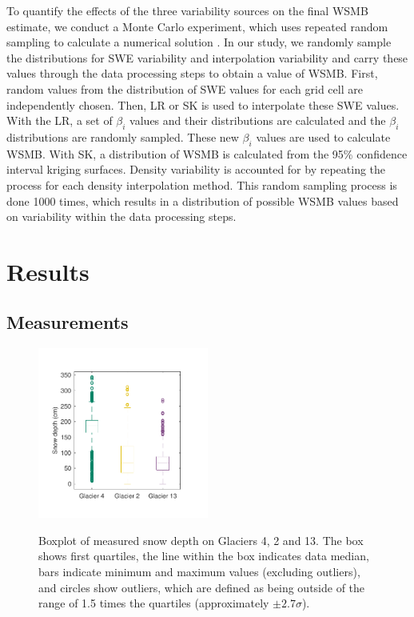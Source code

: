 \documentclass[review,oneside, letterpaper]{igs}
\begin{document}
To quantify the effects of the three variability sources on the final WSMB estimate, we conduct a Monte Carlo experiment, which uses repeated random sampling to calculate a numerical solution \citep{Metropolis1949}. In our study, we randomly sample the distributions for SWE variability and interpolation variability and carry these values through the data processing steps to obtain a value of WSMB. First, random values from the distribution of SWE values for each grid cell are independently chosen. Then, LR or SK is used to interpolate these SWE values. With the LR, a set of $\beta_i$ values and their distributions are calculated and the $\beta_i$ distributions are randomly sampled. These new $\beta_i$ values are used to calculate WSMB. With SK, a distribution of WSMB is calculated from the 95\% confidence interval kriging surfaces. Density variability is accounted for by repeating the process for each density interpolation method. This random sampling process is done 1000 times, which results in a distribution of possible WSMB values based on variability within the data processing steps.

\section{Results}

\subsection{Measurements}

\begin{figure}
	\centering
	\includegraphics[width =0.5\textwidth]{DepthBoxplot.pdf}\\
	\caption{Boxplot of measured snow depth on Glaciers 4, 2 and 13. The box shows first quartiles, the line within the box indicates data median, bars indicate minimum and maximum values (excluding outliers), and circles show outliers, which are defined as being outside of the range of 1.5 times the quartiles (approximately $\pm2.7\sigma$). }
	\label{fig:DepthBoxplot}
\end{figure}
\end{document}
